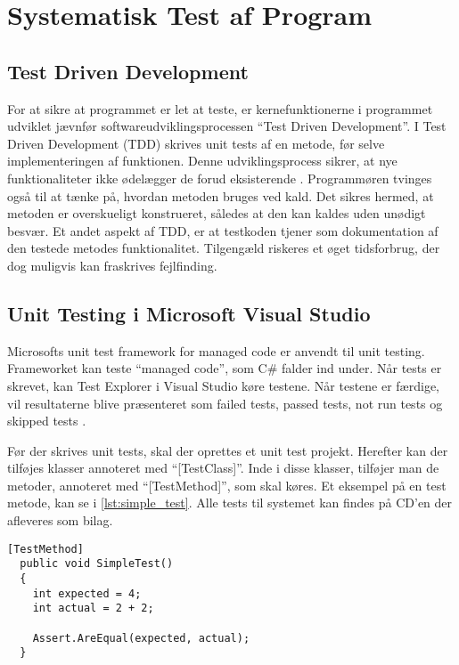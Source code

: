 \section{Systematisk Test af Program}
\label{sec:systematisk_test_af_program}

\subsection{Test Driven Development}
\label{sub:test_driven_development}

For at sikre at programmet er let at teste, er kernefunktionerne i programmet udviklet jævnfør softwareudviklingsprocessen \enquote{Test Driven Development}. I Test Driven Development (TDD) skrives unit tests af en metode, før selve implementeringen af funktionen. Denne udviklingsprocess sikrer, at nye funktionaliteter ikke ødelægger de forud eksisterende \cite{martin2006agile}. Programmøren tvinges også til at tænke på, hvordan metoden bruges ved kald. Det sikres hermed, at metoden er overskueligt konstrueret, således at den kan kaldes uden unødigt besvær. Et andet aspekt af TDD, er at testkoden tjener som dokumentation af den testede metodes funktionalitet. Tilgengæld riskeres et øget tidsforbrug, der dog muligvis kan fraskrives fejlfinding.

\subsection{Unit Testing i Microsoft Visual Studio}
\label{sub:unit_testing_i_microsoft_visual_studio}

Microsofts unit test framework for managed code er anvendt til unit testing. Frameworket kan teste \enquote{managed code}, som C\# falder ind under. Når tests er skrevet, kan Test Explorer i Visual Studio køre testene. Når testene er færdige, vil resultaterne blive præsenteret som failed tests, passed tests, not run tests og skipped tests \cite{msdn_unittest}.

Før der skrives unit tests, skal der oprettes et unit test projekt. Herefter kan der tilføjes klasser annoteret med \enquote{[TestClass]}. Inde i disse klasser, tilføjer man de metoder, annoteret med \enquote{[TestMethod]}, som skal køres. Et eksempel på en test metode, kan se i \cref{lst:simple_test}.
Alle tests til systemet kan findes på CD'en der afleveres som bilag.

\begin{lstlisting}[label=lst:simple_test, caption={Eksempel på testfunktion}]
  [TestMethod]
  public void SimpleTest()
  {
    int expected = 4;
    int actual = 2 + 2;

    Assert.AreEqual(expected, actual);
  }
\end{lstlisting}

